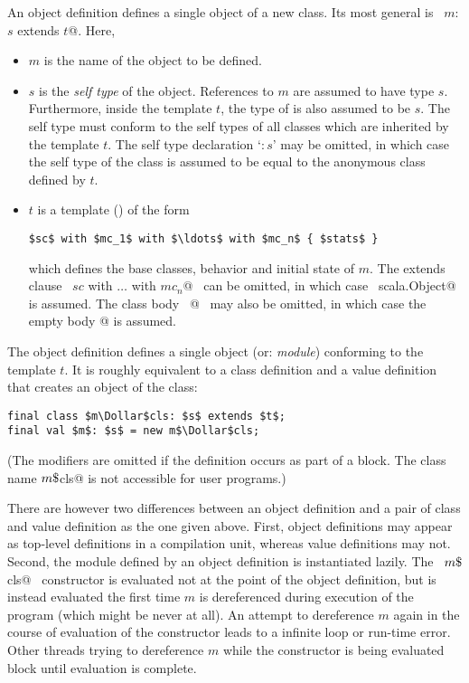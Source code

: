 \documentclass[a4paper,12pt,twoside,titlepage]{book}
\begin{document}
An object definition defines a single object of a new class. Its 
most general is
~\lstinline@object $m$: $s$ extends $t$@. Here,
\begin{itemize}
\item[]
$m$ is the name of the object to be defined.
\item[] $s$ is the {\em self type} of the object. References to
$m$ are assumed to have type $s$. Furthermore, inside the
template $t$, the type of  is also assumed to be $s$.
The self type must conform to the self types of all classes which are
inherited by the template $t$. The self type declaration
`$:s$' may be omitted, in which case the self type of the class is
assumed to be equal to the anonymous class defined by $t$.
\item[] 
$t$ is a
template () of the form
\begin{lstlisting}
$sc$ with $mc_1$ with $\ldots$ with $mc_n$ { $stats$ }
\end{lstlisting}
which defines the base classes, behavior and initial state of $m$.
The extends clause ~\lstinline@extends $sc$ with $\ldots$ with $mc_n$@~
can be omitted, in which case
~\lstinline@extends scala.Object@~ is assumed.  The class body
~@~ may also be omitted, in which case the empty body
\lstinline@{}@ is assumed.
\end{itemize}
The object definition defines a single object (or: {\em module})
conforming to the template $t$.  It is roughly equivalent to a class
definition and a value definition that creates an object of the class:
\begin{lstlisting}
final class $m\Dollar$cls: $s$ extends $t$;
final val $m$: $s$ = new m$\Dollar$cls;
\end{lstlisting}
(The  modifiers are omitted if the definition occurs as
part of a block. The class name \lstinline@$m\mbox{\$}$cls@ is not
accessible for user programs.)

There are however two differences between an object definition and a
pair of class and value definition as the one given above.  First,
object definitions may appear as top-level definitions in a
compilation unit, whereas value definitions may not.  Second, the
module defined by an object definition is instantiated lazily.  The
~\lstinline@new $m\mbox{\$}$cls@~ constructor is evaluated not at the point
of the object definition, but is instead evaluated the first time $m$
is dereferenced during execution of the program (which might be never
at all). An attempt to dereference $m$ again in the course of
evaluation of the constructor leads to a infinite loop or run-time
error.  Other threads trying to dereference $m$ while the constructor
is being evaluated block until evaluation is complete.
\end{document}
